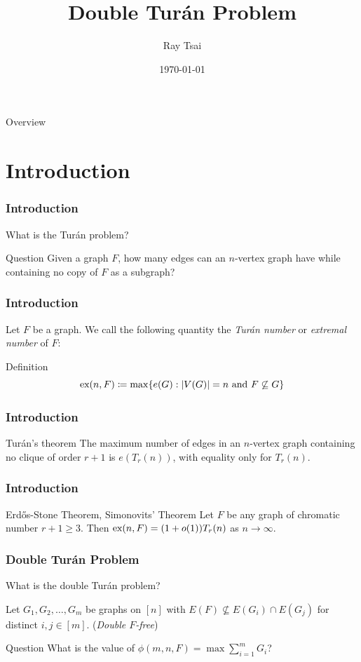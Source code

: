 \documentclass{beamer}
\title{Double Turán Problem}
\author{Ray Tsai}
\date{\today}
\newcommand*{\ex}{\textnormal{ex}}
\begin{document}
\frame{\titlepage}

\begin{frame}{Overview}
  \tableofcontents
\end{frame}

\section{Introduction}

\begin{frame}
\frametitle{Introduction}
What is the Turán problem? \pause

\begin{block}{Question}
  Given a graph $F$, how many edges can an $n$-vertex graph have while containing no copy of $F$ as a subgraph?
\end{block}
\end{frame}

\begin{frame}
\frametitle{Introduction}

Let $F$ be a graph. We call the following quantity the \textit{Turán number} or \textit{extremal number} of $F$:

\begin{block}{Definition}
  \[
    \ex(n, F) \coloneq \max \{ e(G) : |V(G)| = n \text{ and } F \not\subseteq G \}
  \]
\end{block}
\end{frame}
\begin{frame}
  \frametitle{Introduction}

  \begin{block}{Turán's theorem}
    The maximum number of edges in an $n$-vertex graph containing no clique of order $r + 1$ is $e(T_r(n))$, with equality only for $T_r(n)$.
  \end{block}
\end{frame}

\begin{frame}
  \frametitle{Introduction}

  \begin{block}{Erd\H{o}s-Stone Theorem, Simonovits' Theorem}
    Let $F$ be any graph of chromatic number $r + 1 \geq 3$. Then $\ex(n, F) = (1 + o(1))T_r(n)$ as $n \rightarrow \infty$.
  \end{block}
\end{frame}

\begin{frame}
\frametitle{Double Turán Problem}

What is the double Turán problem? \pause

\vspace{0.5cm}

Let $G_1, G_2, \ldots, G_m$ be graphs on $[n]$ with $E(F) \not\subseteq E(G_i) \cap E(G_j)$ for distinct $i, j \in [m]$. \pause (\textit{Double $F$-free})

\pause

\begin{block}{Question}
  What is the value of $\phi(m, n, F) = \max \sum_{i = 1}^m G_i$?
\end{block}
\end{frame}
\end{document}

